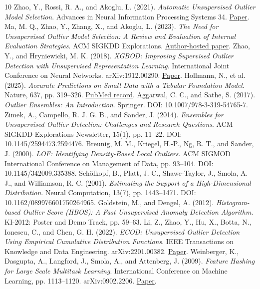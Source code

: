 \documentclass[11pt,a4paper]{article}
\begin{document}
\begin{thebibliography}{10}
 Zhao, Y., Rossi, R. A., and Akoglu, L. (2021). \emph{Automatic Unsupervised Outlier Model Selection}. Advances in Neural Information Processing Systems 34. \href{\detokenize{https://proceedings.neurips.cc/paper/2021/file/23c894276a2c5a16470e6a31f4618d73-Paper.pdf}}{Paper}.
 Ma, M. Q., Zhao, Y., Zhang, X., and Akoglu, L. (2023). \emph{The Need for Unsupervised Outlier Model Selection: A Review and Evaluation of Internal Evaluation Strategies}. ACM SIGKDD Explorations. \href{\detokenize{https://www.andrew.cmu.edu/user/lakoglu/pubs/23-SigKDDExplor-UnsupervisedModelSelection-WhitePaperSurvey.pdf}}{Author-hosted paper}.
 Zhao, Y., and Hryniewicki, M. K. (2018). \emph{XGBOD: Improving Supervised Outlier Detection with Unsupervised Representation Learning}. International Joint Conference on Neural Networks. arXiv:1912.00290. \href{\detokenize{https://arxiv.org/abs/1912.00290}}{Paper}.
 Hollmann, N., et al. (2025). \emph{Accurate Predictions on Small Data with a Tabular Foundation Model}. Nature, 637, pp. 319--326. \href{\detokenize{https://pubmed.ncbi.nlm.nih.gov/39780007/}}{PubMed record}.
 Aggarwal, C. C., and Sathe, S. (2017). \emph{Outlier Ensembles: An Introduction}. Springer. DOI: 10.1007/978-3-319-54765-7.
 Zimek, A., Campello, R. J. G. B., and Sander, J. (2014). \emph{Ensembles for Unsupervised Outlier Detection: Challenges and Research Questions}. ACM SIGKDD Explorations Newsletter, 15(1), pp. 11--22. DOI: 10.1145/2594473.2594476.
 Breunig, M. M., Kriegel, H.-P., Ng, R. T., and Sander, J. (2000). \emph{LOF: Identifying Density-Based Local Outliers}. ACM SIGMOD International Conference on Management of Data, pp. 93--104. DOI: 10.1145/342009.335388.
 Sch\"olkopf, B., Platt, J. C., Shawe-Taylor, J., Smola, A. J., and Williamson, R. C. (2001). \emph{Estimating the Support of a High-Dimensional Distribution}. Neural Computation, 13(7), pp. 1443--1471. DOI: 10.1162/089976601750264965.
 Goldstein, M., and Dengel, A. (2012). \emph{Histogram-based Outlier Score (HBOS): A Fast Unsupervised Anomaly Detection Algorithm}. KI-2012: Poster and Demo Track, pp. 59--63.
 Li, Z., Zhao, Y., Hu, X., Botta, N., Ionescu, C., and Chen, G. H. (2022). \emph{ECOD: Unsupervised Outlier Detection Using Empirical Cumulative Distribution Functions}. IEEE Transactions on Knowledge and Data Engineering. arXiv:2201.00382. \href{\detokenize{https://arxiv.org/abs/2201.00382}}{Paper}.
 Weinberger, K., Dasgupta, A., Langford, J., Smola, A., and Attenberg, J. (2009). \emph{Feature Hashing for Large Scale Multitask Learning}. International Conference on Machine Learning, pp. 1113--1120. arXiv:0902.2206. \href{\detokenize{https://arxiv.org/abs/0902.2206}}{Paper}.

\end{thebibliography}
\end{document}
